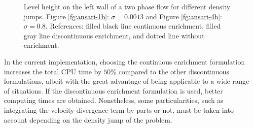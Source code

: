   \begin{figure}[h]
  \centering
   \caption{Level height on the left wall of a two phase flow for different density jumps. Figure \ref{fg:ansari-1b}: $\sigma=0.0013$ and Figure \ref{fg:ansari-4b}: $\sigma=0.8$. References: filled black line continuous enrichment, filled gray line discontinuous enrichment, and dotted line without enrichment.}
   \label{fg:ansari-results-b}                %
\end{figure}

In the current implementation, choosing the continuous enrichment formulation increases the total CPU time by $50\%$ compared to the other discontinuous formulations, albeit with the great advantage of being applicable to a wide range of situations. If the discontinuous enrichment formulation is used, better computing times are obtained. Nonetheless, some particularities, such as integrating the velocity divergence term by parts or not, must be taken into account depending on the density jump of the problem.

\clearpage
